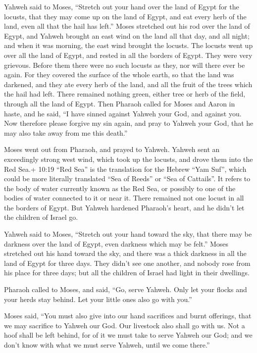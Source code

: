  Yahweh said to Moses, ``Stretch out your hand over the
land of Egypt for the locusts, that they may come up on the land of
Egypt, and eat every herb of the land, even all that the hail has
left.''  Moses stretched out his rod over the land of
Egypt, and Yahweh brought an east wind on the land all that day, and all
night; and when it was morning, the east wind brought the locusts.
 The locusts went up over all the land of Egypt, and rested
in all the borders of Egypt. They were very grievous. Before them there
were no such locusts as they, nor will there ever be again.
 For they covered the surface of the whole earth, so that
the land was darkened, and they ate every herb of the land, and all the
fruit of the trees which the hail had left. There remained nothing
green, either tree or herb of the field, through all the land of Egypt.
 Then Pharaoh called for Moses and Aaron in haste, and he
said, ``I have sinned against Yahweh your God, and against you.
 Now therefore please forgive my sin again, and pray to
Yahweh your God, that he may also take away from me this death.''

 Moses went out from Pharaoh, and prayed to Yahweh.
 Yahweh sent an exceedingly strong west wind, which took up
the locusts, and drove them into the Red Sea.+ 10:19 ``Red Sea'' is the
translation for the Hebrew ``Yam Suf'', which could be more literally
translated ``Sea of Reeds'' or ``Sea of Cattails''. It refers to the
body of water currently known as the Red Sea, or possibly to one of the
bodies of water connected to it or near it. There remained not one
locust in all the borders of Egypt.  But Yahweh hardened
Pharaoh's heart, and he didn't let the children of Israel go.

 Yahweh said to Moses, ``Stretch out your hand toward the
sky, that there may be darkness over the land of Egypt, even darkness
which may be felt.''  Moses stretched out his hand toward
the sky, and there was a thick darkness in all the land of Egypt for
three days.  They didn't see one another, and nobody rose
from his place for three days; but all the children of Israel had light
in their dwellings.

 Pharaoh called to Moses, and said, ``Go, serve Yahweh.
Only let your flocks and your herds stay behind. Let your little ones
also go with you.''

 Moses said, ``You must also give into our hand sacrifices
and burnt offerings, that we may sacrifice to Yahweh our God.
 Our livestock also shall go with us. Not a hoof shall be
left behind, for of it we must take to serve Yahweh our God; and we
don't know with what we must serve Yahweh, until we come there.''

